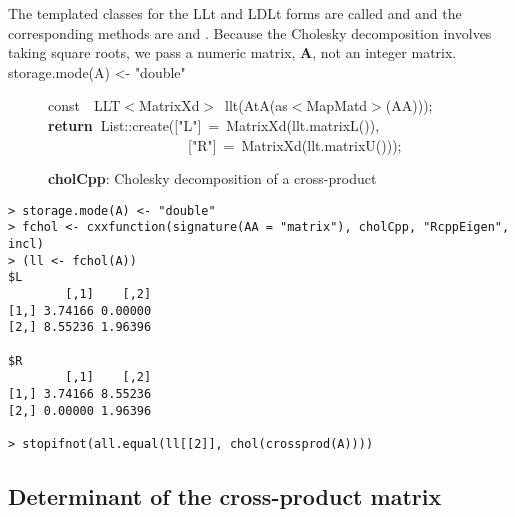 \documentclass[shortnames,article]{jss}
\newcommand{\hlstd}[1]{\textcolor[rgb]{0,0,0}{#1}}
\newcommand{\hlopt}[1]{\textcolor[rgb]{0,0,0}{#1}}
\newcommand{\hlstr}[1]{\textcolor[rgb]{0.90,0.15,0.15}{#1}}
\newcommand{\hlkwa}[1]{\textcolor[rgb]{0.61,0.13,0.93}{\bf{#1}}}
\newcommand{\hlkwb}[1]{\textcolor[rgb]{0.13,0.54,0.13}{#1}}
\newcommand{\hlkwd}[1]{\textcolor[rgb]{0,0,0}{#1}}
\begin{document}
The templated  classes for the LLt and LDLt forms are
called  and  and the corresponding methods are
 and .
Because the Cholesky decomposition involves taking square roots, we
pass a numeric matrix, $\bm A$, not an integer matrix.
storage.mode(A) <- "double"
\begin{figure}[htb]
  \noindent
  \ttfamily
  \hlstd{}\hlkwb{const}\hlstd{\ \ }\hlkwb{}\hlstd{LLT}\hlopt{$<$}\hlstd{MatrixXd}\hlopt{$>$\ }\hlstd{}\hlkwd{llt}\hlstd{}\hlopt{(}\hlstd{}\hlkwd{AtA}\hlstd{}\hlopt{(}\hlstd{as}\hlopt{$<$}\hlstd{MapMatd}\hlopt{$>$(}\hlstd{AA}\hlopt{)));}\hspace*{\fill}\\
  \hlstd{}\hlkwa{return\ }\hlstd{List}\hlopt{::}\hlstd{}\hlkwd{create}\hlstd{}\hlopt{(}\hlstd{\textunderscore }\hlopt{{[}}\hlstd{}\hlstr{"L"}\hlstd{}\hlopt{{]}\ =\ }\hlstd{}\hlkwd{MatrixXd}\hlstd{}\hlopt{(}\hlstd{llt}\hlopt{.}\hlstd{}\hlkwd{matrixL}\hlstd{}\hlopt{()),}\hspace*{\fill}\\
  \hlstd{}\hlstd{\ \ \ \ \ \ \ \ \ \ \ \ \ \ \ \ \ \ \ \ }\hlstd{\textunderscore }\hlopt{{[}}\hlstd{}\hlstr{"R"}\hlstd{}\hlopt{{]}\ =\ }\hlstd{}\hlkwd{MatrixXd}\hlstd{}\hlopt{(}\hlstd{llt}\hlopt{.}\hlstd{}\hlkwd{matrixU}\hlstd{}\hlopt{()));}\hlstd{}\hspace*{\fill}\\
  \mbox{}
  \normalfont
  \normalsize
  \caption{\textbf{cholCpp}: Cholesky decomposition of a cross-product}
  \label{chol}
\end{figure}

\begin{verbatim}
> storage.mode(A) <- "double"
> fchol <- cxxfunction(signature(AA = "matrix"), cholCpp, "RcppEigen", incl)
> (ll <- fchol(A))
$L
        [,1]    [,2]
[1,] 3.74166 0.00000
[2,] 8.55236 1.96396

$R
        [,1]    [,2]
[1,] 3.74166 8.55236
[2,] 0.00000 1.96396

> stopifnot(all.equal(ll[[2]], chol(crossprod(A))))
\end{verbatim}



\subsection{Determinant of the cross-product matrix}
\label{sec:determinant}
\end{document}
